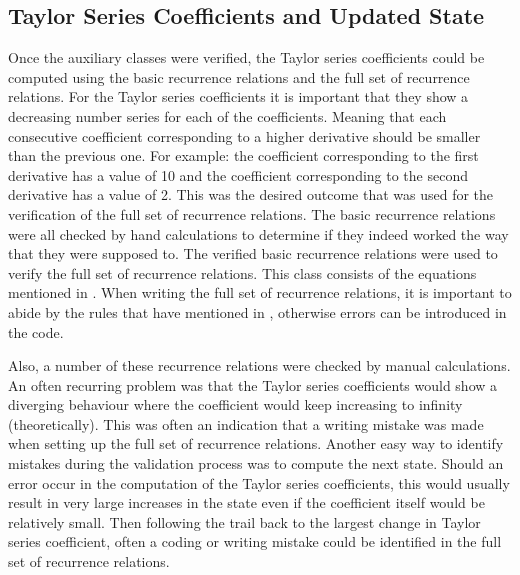 \subsection{Taylor Series Coefficients and Updated State}
\label{subsec:TaySerCoefverval}
Once the auxiliary classes were verified, the Taylor series coefficients could be computed using the basic recurrence relations and the full set of recurrence relations. For the Taylor series coefficients it is important that they show a decreasing number series for each of the coefficients. Meaning that each consecutive coefficient corresponding to a higher derivative should be smaller than the previous one. For example: the coefficient corresponding to the first derivative has a value of 10 and the coefficient corresponding to the second derivative has a value of 2. This was the desired outcome that was used for the verification of the full set of recurrence relations. The basic recurrence relations were all checked by hand calculations to determine if they indeed worked the way that they were supposed to. The verified basic recurrence relations were used to verify the full set of recurrence relations. This class consists of the equations mentioned in . When writing the full set of recurrence relations, it is important to abide by the rules that have mentioned in , otherwise errors can be introduced in the code. 

Also, a number of these recurrence relations were checked by manual calculations. An often recurring problem was that the Taylor series coefficients would show a diverging behaviour where the coefficient would keep increasing to infinity (theoretically). This was often an indication that a writing mistake was made when setting up the full set of recurrence relations. Another easy way to identify mistakes during the validation process was to compute the next state. Should an error occur in the computation of the Taylor series coefficients, this would usually result in very large increases in the state even if the coefficient itself would be relatively small. Then following the trail back to the largest change in Taylor series coefficient, often a coding or writing mistake could be identified in the full set of recurrence relations. 

